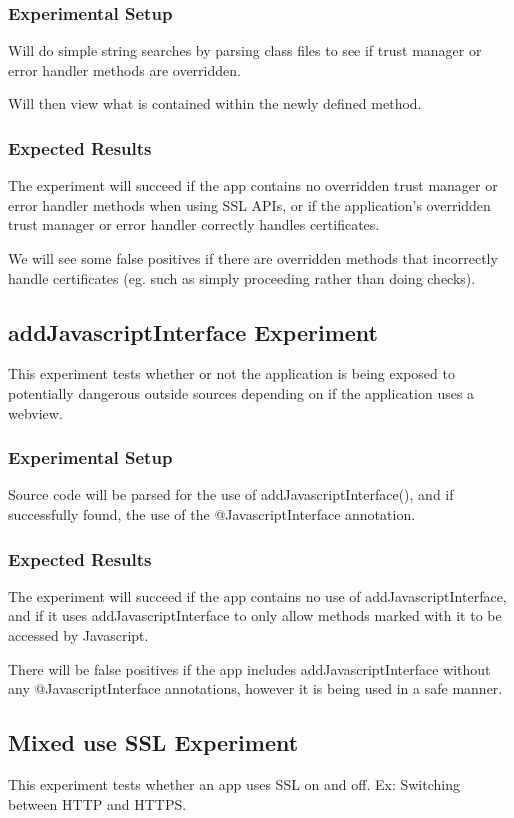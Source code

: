 \documentclass[10pt,twocolumn,pdftex]{article}
\begin{document}
    \subsubsection{Experimental Setup}
    Will do simple string searches by parsing class files to see if trust manager or error handler methods are overridden.
    
    Will then view what is contained within the newly defined method. 

    \subsubsection{Expected Results}
    The experiment will succeed if the app contains no overridden trust manager or error handler methods when using SSL APIs, or if the application's overridden trust manager or error handler correctly handles certificates.

    We will see some false positives if there are overridden methods that incorrectly handle certificates (eg. such as simply proceeding rather than doing checks).


\subsection{addJavascriptInterface Experiment}
This experiment tests whether or not the application is being exposed to potentially dangerous outside sources depending on if the application uses a webview.

    \subsubsection{Experimental Setup}
    Source code will be parsed for the use of addJavascriptInterface(), and if successfully found, the use of the @JavascriptInterface annotation.

    \subsubsection{Expected Results}
    The experiment will succeed if the app contains no use of addJavascriptInterface, and if it uses addJavascriptInterface to only allow methods marked with it to be accessed by Javascript.

    There will be false positives if the app includes addJavascriptInterface without any @JavascriptInterface annotations, however it is being used in a safe manner.


\subsection{Mixed use SSL Experiment}
This experiment tests whether an app uses SSL on and off. Ex: Switching between HTTP and HTTPS.
\end{document}
